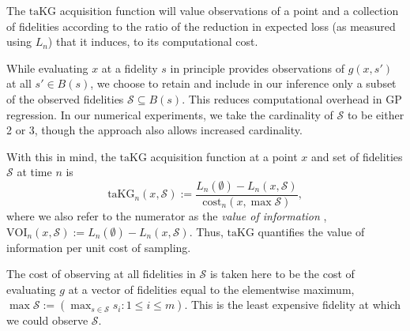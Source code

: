 \documentclass[letterpaper]{article}
\newcommand{\cost}{\text{cost}}
\newcommand{\taKG}{\text{taKG}}
\numberwithin{equation}{section}
\renewcommand{\S}{\mathcal{S}}
\newcommand{\loss}{L}
\newcommand{\xxcomment}[4]{\textcolor{#1}{[$^{\textsc{#2}}_{\textsc{#3}}$ #4]}}
\newcommand{\pf}[1]{\xxcomment{blue}{P}{F}{#1}}
\begin{document}


The $\taKG$ acquisition function will value observations of a point and a collection of fidelities according to the ratio of the reduction in expected loss (as measured using $\loss_n$) that it induces, to its computational cost.

While evaluating $x$ at a fidelity $s$ in principle provides observations of $g(x,s')$ at all $s' \in  B(s)$, we choose to retain and include in our inference only a subset of the observed fidelities $\S \subseteq B(s)$.  This reduces computational overhead in GP regression.  In our numerical experiments, we take the cardinality of $\S$ to be either 2 or 3, though the approach also allows increased cardinality. 

With this in mind, the $\taKG$ acquisition function at a point $x$ and set of fidelities $\S$ at time $n$ is
\begin{equation*}
\taKG_n(x, \mathcal{S}) := \frac{\loss_n(\emptyset) - \loss_n(x,\S)}{\cost_n(x, \max \S)},
\end{equation*}
where we also refer to the numerator as the {\it value of information} \citep{Ho66},
$\text{VOI}_n(x,\S) := \loss_n(\emptyset) - \loss_n(x,\S)$.
Thus, $\taKG$ quantifies the value of information per unit cost of sampling.

The cost of observing at all fidelities in $\S$ is taken here to be the cost of evaluating $g$ at a vector of fidelities equal to the elementwise maximum, $\max \mathcal{S} := (\max_{s \in \mathcal{S}} s_i: 1 \le i \le m)$.  
This is the least expensive fidelity at which we could observe $\S$. 
\end{document}
